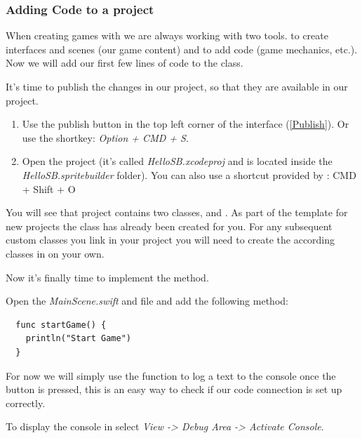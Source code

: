 \subsubsection{Adding Code to a \SB{} project}
When creating games with \SB{} we are always working with two tools. \SB{} to
create interfaces and scenes (our game content) and \xcode{} to add code (game
mechanics, etc.). Now we will add our first few lines of code to the
 class. 

It's time to publish the changes in our \SB{}
project, so that they are available in our \xcode{} project. 



\begin{leftbar}
\begin{enumerate}
  \item Use the publish button in the top left corner of the \SB{} interface
(\ref{Publish}). Or use the shortkey: \textit{Option + CMD + S}.
  \item Open the \xcode{} project (it's called \textit{HelloSB.xcodeproj} and is
located inside the \textit{HelloSB.spritebuilder} folder). You can also use a
shortcut provided by \SB{}: CMD + Shift + O
\end{enumerate}
\end{leftbar}

You will see that project contains two classes,  and
. As part of the template for new \SB{} projects the
 class has already been created for you. For any
subsequent custom classes you link in your \SB{} project you will need to create
the according classes in \xcode{} on your own.

Now it's finally time to implement the  method. 

\begin{leftbar}
Open the \textit{MainScene.swift} and file and add the following method:

\begin{lstlisting}
  func startGame() {
    println("Start Game")
  }
\end{lstlisting} 
\end{leftbar}

For now we will simply use the  function to log a text to
the console once the button is pressed, this is an easy way to check if our code
connection is set up correctly.

\begin{details} 
To display the console in \xcode{} select \textit{View -> Debug Area ->
Activate Console}.
\end{details}

